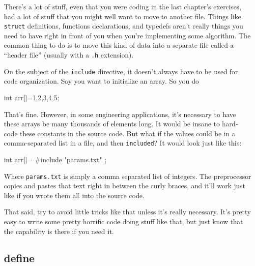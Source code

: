 \documentclass[ebook,11pt,oneside,openany]{memoir}
\newcommand{\cf}[1]{\texttt{#1}}
\begin{document}
There's a lot of stuff, even that you were coding in the last chapter's exercises, had a lot of stuff that you might well want to move to another file. Things like \cf{struct} definitions, functions declarations, and typedefs aren't really things you need to have right in front of you when you're implementing some algorithm. The common thing to do is to move this kind of data into a separate file called a ``header file'' (usually with a \cf{.h} extension).


On the subject of the \cf{include} directive, it doesn't always have to be used for code organization. Say you want to initialize an array. So you do

\begin{code}[language=C]
int arr[]={1,2,3,4,5};
\end{code}

\noindent
That's fine. However, in some engineering applications, it's necessary to have these arrays be many thousands of elements long. It would be insane to hard-code these constants in the source code. But what if the values could be in a comma-separated list in a file, and then \cf{included}? It would look just like this:

\begin{code}[language=C]
int arr[]={
  #include "params.txt"
};
\end{code}

Where \cf{params.txt} is simply a comma separated list of integers. The preprocessor copies and pastes that text right in between the curly braces, and it'll work just like if you wrote them all into the source code.

That said, try to avoid little tricks like that unless it's really necessary. It's pretty easy to write some pretty horrific code doing stuff like that, but just know that the capability is there if you need it.

\subsection{define}
\end{document}
